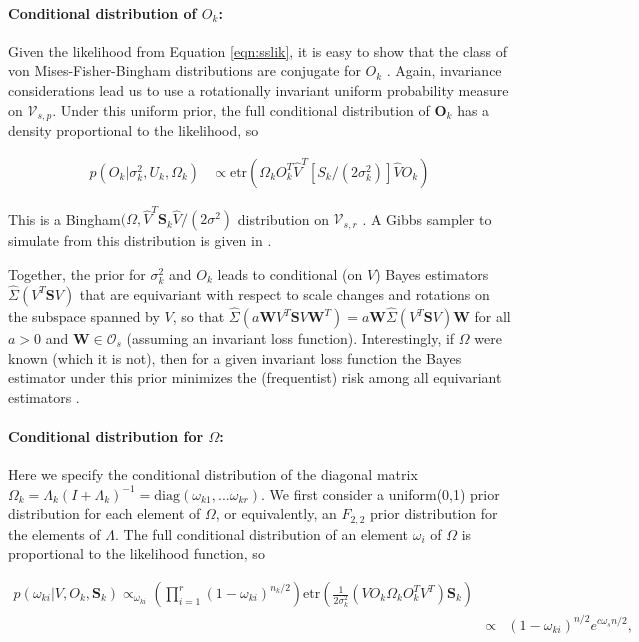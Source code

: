 \documentclass{article}
\newcommand{\bl}[1]{{\mathbf #1}}
\newcommand{\etr}{\text{etr}}
\begin{document}
\paragraph{Conditional distribution of $O_k$:} Given the likelihood
from Equation \ref{eqn:sslik}, it is easy to show that the class of
von Mises-Fisher-Bingham distributions are conjugate for $O_k$
\citep{Hoff2009, Hoff2012}.  Again, invariance considerations
lead us to use a rotationally invariant uniform probability measure on
$\mathcal V_{s,p}$.  Under this uniform prior, the full conditional
distribution of $\bl O_k$ has a density proportional to the
likelihood, so

\begin{align}
\label{lik_vo}
 p(O_k | \sigma^2_k, U_k, \Omega_k) & \propto \etr(\Omega_kO^T_k\hat{V}^T[S_k/(2\sigma^2_k)]\hat{V}O_k)
\end{align}

\noindent This is a Bingham$(\Omega, \hat{V}^T \bl S_k \hat{V}/(2\sigma^2)$
distribution on $\mathcal V_{s, r}$ \citep{Khatri1977}. A
Gibbs sampler to simulate from this distribution is given in
\citet{Hoff2012}.  

Together, the prior for $\sigma_k^2$ and $O_k$ leads to conditional
(on $V$) Bayes estimators $\hat \Sigma(V^T \bl S V)$ that are
equivariant with respect to scale changes and rotations on the
subspace spanned by $V$, so
that $\hat \Sigma(a \bl W V^T \bl S V \bl W^T) = a \bl W \hat\Sigma(V^T
\bl S V) \bl W$
for all $a>0$ and $\bl W\in \mathcal O_{s}$ (assuming an invariant
loss function). Interestingly, if $\Omega$ were known (which it is
not), then for a given invariant loss function the Bayes estimator
under this prior minimizes the (frequentist) risk among all
equivariant estimators \citep{Eaton1989}.

\paragraph{Conditional distribution for $\Omega$:} Here we specify the conditional
distribution of the diagonal matrix $\Omega_k =
\Lambda_k(I+\Lambda_k)^{-1} = \text{diag}(\omega_{k1}, ... \omega_{kr})$.  We first consider a uniform(0,1) prior distribution for each element of $\Omega$, or
equivalently, an $F_{2,2}$ prior distribution for the elements of
$\Lambda$.  The full conditional distribution of an
element $\omega_i$ of $\Omega$ is proportional to the likelihood
function, so

\begin{align}
p(\omega_{ki}|V, O_k, \bl S_k) \propto_{\omega_{ki}}
  \left(\prod_{i=1}^r(1-\omega_{ki})^{n_k/2}  \right)
  \etr(\frac{1}{2\sigma_k^2}(VO_k\Omega_kO_k^TV^T)\mathbf{S}_k) \\
&  \propto & (1-\omega_{ki})^{n/2} e^{c \omega_s  n/2},    
\label{eqn:wpost}
\end{align}
\end{document}
